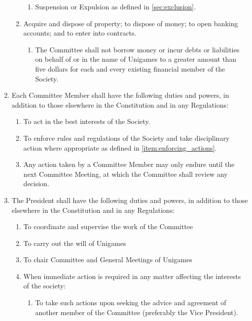 \documentclass[a4paper]{article}
\begin{document}
\begin{enumerate}
\begin{enumerate}
\begin{enumerate}
            \item Suspension or Expulsion as defined in \cref{sec:exclusion}.
        \end{enumerate}
        \item Acquire and dispose of property; to dispose of money; to open banking accounts; and to enter into contracts.
        \begin{enumerate}
            \item The Committee shall not borrow money or incur debts or liabilities on behalf of or in the name of Unigames to a greater amount than five dollars for each and every existing financial member of the Society.
        \end{enumerate}
    \end{enumerate}
    \item Each Committee Member shall have the following duties and powers, in addition to those elsewhere in the Constitution and in any Regulations:
    \begin{enumerate}
        \item To act in the best interests of the Society.
        \item To enforce rules and regulations of the Society and take disciplinary action where appropriate as defined in \cref{item:enforcing_actions}.
        \item Any action taken by a Committee Member may only endure until the next Committee Meeting, at which the Committee shall review any decision.
    \end{enumerate}
    \item The President shall have the following duties and powers, in addition to those elsewhere in the Constitution and in any Regulations: \label{item:pres_duties}
          \begin{enumerate}
              \item To coordinate and supervise the work of the Committee
              \item To carry out the will of Unigames
              \item To chair Committee and General Meetings of Unigames
              \item When immediate action is required in any matter affecting the interests of the society:
                    \begin{enumerate}
                        \item To take such actions upon seeking the advice and agreement of another member of the Committee (preferably the Vice President).

\end{enumerate}
\end{enumerate}
\end{enumerate}
\end{document}
